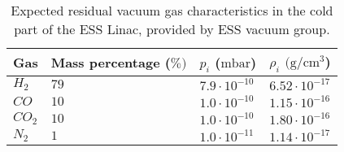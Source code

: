 \begin{table}[ht]
	\centering
	\caption[Expected residual vacuum gas characteristics in the cold part of the ESS Linac, provided by ESS vacuum group]
	{Expected residual vacuum gas characteristics in the cold part of the ESS Linac, provided by ESS vacuum group.}
	\label{chap3:ess_vacuum_gas}
	\begin{tabularx}{\linewidth}{XlXX}
		\toprule
		Gas        & Mass percentage (\(\%)\) & $p_{i}$ (\(\mathrm{mbar}\)) & $\rho_{i}$ $(\mathrm{g/cm^{3}}$) \\
		\midrule
		\(H_{2}\)  & \(79\)                   & \(7.9\cdot10^{-10}\)        & \(6.52\cdot
		10^{-17}\)                                                                                             \\
		\(CO\)     & \(10\)                   & \(1.0\cdot10^{-10}\)        & \(1.15\cdot
		10^{-16}\)                                                                                             \\
		\(CO_{2}\) & \(10\)                   & \(1.0\cdot10^{-10}\)        & \(1.80\cdot
		10^{-16}\)                                                                                             \\
		\(N_{2}\)  & \(1\)                    & \(1.0\cdot10^{-11}\)        & \(1.14\cdot
		10^{-17}\)                                                                                             \\
		\bottomrule
	\end{tabularx}
\end{table}